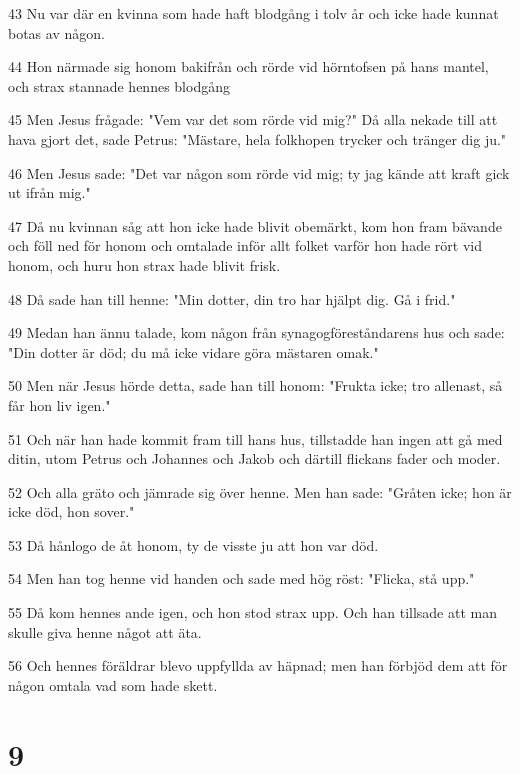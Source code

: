 \par 43 Nu var där en kvinna som hade haft blodgång i tolv år och icke hade kunnat botas av någon.
\par 44 Hon närmade sig honom bakifrån och rörde vid hörntofsen på hans mantel, och strax stannade hennes blodgång
\par 45 Men Jesus frågade: "Vem var det som rörde vid mig?" Då alla nekade till att hava gjort det, sade Petrus: "Mästare, hela folkhopen trycker och tränger dig ju."
\par 46 Men Jesus sade: "Det var någon som rörde vid mig; ty jag kände att kraft gick ut ifrån mig."
\par 47 Då nu kvinnan såg att hon icke hade blivit obemärkt, kom hon fram bävande och föll ned för honom och omtalade inför allt folket varför hon hade rört vid honom, och huru hon strax hade blivit frisk.
\par 48 Då sade han till henne: "Min dotter, din tro har hjälpt dig. Gå i frid."
\par 49 Medan han ännu talade, kom någon från synagogföreståndarens hus och sade: "Din dotter är död; du må icke vidare göra mästaren omak."
\par 50 Men när Jesus hörde detta, sade han till honom: "Frukta icke; tro allenast, så får hon liv igen."
\par 51 Och när han hade kommit fram till hans hus, tillstadde han ingen att gå med ditin, utom Petrus och Johannes och Jakob och därtill flickans fader och moder.
\par 52 Och alla gräto och jämrade sig över henne. Men han sade: "Gråten icke; hon är icke död, hon sover."
\par 53 Då hånlogo de åt honom, ty de visste ju att hon var död.
\par 54 Men han tog henne vid handen och sade med hög röst: "Flicka, stå upp."
\par 55 Då kom hennes ande igen, och hon stod strax upp. Och han tillsade att man skulle giva henne något att äta.
\par 56 Och hennes föräldrar blevo uppfyllda av häpnad; men han förbjöd dem att för någon omtala vad som hade skett.

\chapter{9}

